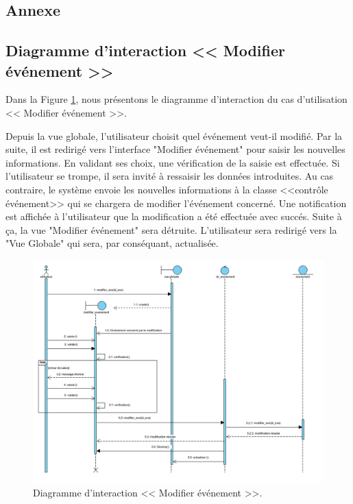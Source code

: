 \begin{appendix}
\chapter*{Annexe}
\renewcommand{\headrulewidth}{1pt}
\section*{Diagramme d'interaction << Modifier \'ev\'enement >>}

Dans la Figure \ref{modifierevent}, nous pr\'esentons le diagramme d'interaction du cas d'utilisation << Modifier \'ev\'enement >>. 

Depuis la vue globale, l'utilisateur choisit quel \'ev\'enement veut-il modifi\'e. Par la suite, il est redirig\'e vers l'interface "Modifier \'ev\'enement" pour saisir les nouvelles informations. En validant ses choix, une v\'erification de la saisie est effectu\'ee. Si l'utilisateur se trompe, il sera invit\'e \`a ressaisir les donn\'ees introduites. Au cas contraire, le syst\`eme envoie les nouvelles informations \`a la classe <<contr\^ole \'ev\'enement>> qui se chargera de modifier l'\'ev\'enement concern\'e. Une notification est affich\'ee \`a l'utilisateur que la modification a \'et\'e effectu\'ee avec succ\'es. Suite \`a \c{c}a, la vue "Modifier \'ev\'enement" sera d\'etruite. L'utilisateur sera redirig\'e vers la "Vue Globale" qui sera, par cons\'equant, actualis\'ee.  
\begin{landscape}
\begin{figure}[H]
	\centering
		\includegraphics[width=21cm]{images/modifier_event.PNG}
	\caption{Diagramme d'interaction << Modifier \'ev\'enement >>.}
	\label{modifierevent}
\end{figure}
\end{landscape}


\end{appendix}
